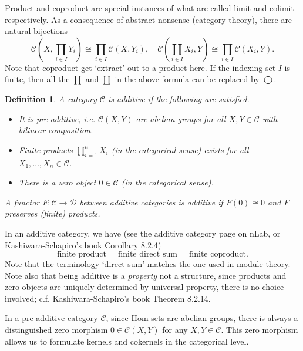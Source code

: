 \documentclass[11pt,a4paper]{article}
\numberwithin{equation}{section}
\theoremstyle{all}
\newtheorem{definition}[theorem]{Definition}
\newtheorem{exercise}[theorem]{Exercise}
\theoremstyle{remark}
\newcommand{\CC}{\mathcal{C}}
\newcommand{\CD}{\mathcal{D}}
\newcommand{\defn}[1]{\textsl{\color{darkblue} #1}}
\begin{document}
Product and coproduct are special instances of what-are-called limit and colimit respectively.  As a consequence of abstract nonsense (category theory), there are natural bijections
\[
\CC(X,\prod_{i\in I}Y_i) \cong \prod_{i\in I} \CC(X,Y_i), \quad \CC(\coprod_{i\in I}X_i,Y) \cong \prod_{i\in I} \CC(X_i,Y).
\]
Note that coproduct get `extract' out to a product here.
If the indexing set $I$ is finite, then all the $\prod$ and $\coprod$ in the above formula can be replaced by $\bigoplus$.

\begin{definition}
A category $\CC$ is \defn{additive} if the following are satisfied.
\begin{itemize}
\item It is \defn{pre-additive}, i.e. $\CC(X,Y)$ are abelian groups for all $X,Y\in\CC$ with bilinear composition.
\item Finite products $\prod_{i=1}^n X_i$ (in the categorical sense) exists for all $X_1,\ldots, X_n\in\CC$.
\item There is a zero object $0\in \CC$ (in the categorical sense).
\end{itemize}
A functor $F:\CC\to\CD$ between additive categories is \defn{additive} if $F(0)\cong 0$ and $F$ preserves (finite) products.
\end{definition}
In an additive category, we have (see the additive category page on nLab, or Kashiwara-Schapiro's book Corollary 8.2.4)
\[
\text{finite product = finite direct sum = finite coproduct.}
\]
Note that the terminology `direct sum' matches the one used in module theory.
Note also that being additive is a \emph{property} not a structure, since products and zero objects are uniquely determined by universal property, there is no choice involved; c.f. Kashiwara-Schapiro's book Theorem 8.2.14.


In a pre-additive category $\CC$, since Hom-sets are abelian groups, there is always a distinguished zero morphism $0\in \CC(X,Y)$ for any $X,Y\in\CC$.  This zero morphism allows us to formulate kernels and cokernels in the categorical level.
\end{document}
